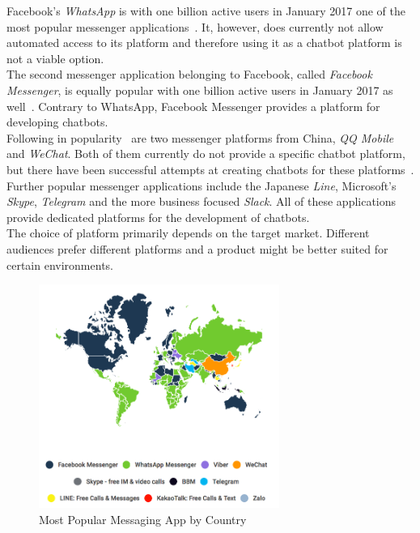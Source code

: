 Facebook's \emph{WhatsApp} is with one billion active users in January 2017 one of the most popular messenger applications~\cite{fbpopular}.
It, however, does currently not allow automated access to its platform and therefore using it as a chatbot platform is not a viable option.
\\

The second messenger application belonging to Facebook, called \emph{Facebook Messenger}, is equally popular with one billion active users in January 2017 as well~\cite{fbpopular}.
Contrary to WhatsApp, Facebook Messenger provides a platform for developing chatbots.
\\

Following in popularity~\cite{appusage} are two messenger platforms from China, \emph{QQ Mobile} and \emph{WeChat}.
Both of them currently do not provide a specific chatbot platform,
but there have been successful attempts at creating chatbots for these platforms~\cite{wechatbot}.
\\

Further popular messenger applications include the Japanese \emph{Line}, Microsoft's \emph{Skype}, \emph{Telegram} and the more business focused \emph{Slack}.
All of these applications provide dedicated platforms for the development of chatbots.
\\

The choice of platform primarily depends on the target market.
Different audiences prefer different platforms and a product might be better suited for certain environments.

\begin{figure}[H]
	\centering
	\includegraphics[width=0.7\textwidth]{images/similarweb-messenger-by-country.png}
	\caption{Most Popular Messaging App by Country~\cite{similarweb}}
	\label{fig:similarweb}
\end{figure}

